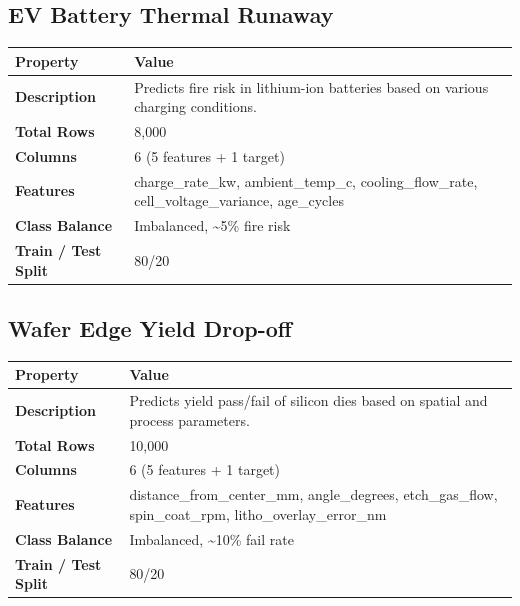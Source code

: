 \documentclass[11pt,a4paper]{article}
\begin{document}
\subsection{EV Battery Thermal Runaway}

\begin{tabularx}{\linewidth}{@{}>{\bfseries}l X @{}}
  \arrayrulecolor{tableheader}
  \toprule
  \rowcolor{tableheader} Property & Value \\
  \midrule
  \rowcolor{white} Description & Predicts fire risk in lithium-ion batteries based on various charging conditions. \\
  \rowcolor{tablerow} Total Rows & 8,000 \\
  \rowcolor{white} Columns & 6 (5 features + 1 target) \\
  \rowcolor{tablerow} Features & charge\_rate\_kw, ambient\_temp\_c, cooling\_flow\_rate, cell\_voltage\_variance, age\_cycles \\
  \rowcolor{white} Class Balance & Imbalanced, \textasciitilde{}5\% fire risk \\
  \rowcolor{tablerow} Train / Test Split & 80/20 \\
  \bottomrule
\end{tabularx}

\vspace{6pt}

\subsection{Wafer Edge Yield Drop-off}

\begin{tabularx}{\linewidth}{@{}>{\bfseries}l X @{}}
  \arrayrulecolor{tableheader}
  \toprule
  \rowcolor{tableheader} Property & Value \\
  \midrule
  \rowcolor{white} Description & Predicts yield pass/fail of silicon dies based on spatial and process parameters. \\
  \rowcolor{tablerow} Total Rows & 10,000 \\
  \rowcolor{white} Columns & 6 (5 features + 1 target) \\
  \rowcolor{tablerow} Features & distance\_from\_center\_mm, angle\_degrees, etch\_gas\_flow, spin\_coat\_rpm, litho\_overlay\_error\_nm \\
  \rowcolor{white} Class Balance & Imbalanced, \textasciitilde{}10\% fail rate \\
  \rowcolor{tablerow} Train / Test Split & 80/20 \\
  \bottomrule
\end{tabularx}
\end{document}
